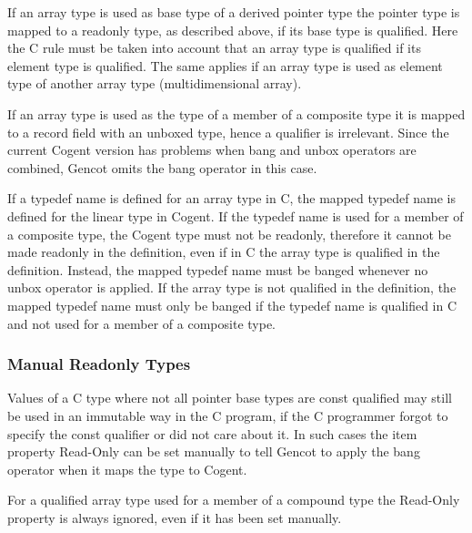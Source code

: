 If an array type is used as base type of a derived pointer type the pointer type is mapped to a readonly type, as
described above, if its base type is  qualified. Here the C rule must be taken into account that an array
type is  qualified if its element type is  qualified. The same applies if an array type is used
as element type of another array type (multidimensional array).

If an array type is used as the type of a member of a composite type it is mapped to a record field with an unboxed type,
hence a  qualifier is irrelevant. Since the current Cogent version has problems when bang and unbox operators
are combined, Gencot omits the bang operator in this case. 

If a typedef name is defined for an array type in C, the mapped typedef name is defined for the linear type in Cogent. 
If the typedef name is used for a member of a composite type, the Cogent type must not be readonly, therefore it
cannot be made readonly in the definition, even if in C the array type is  qualified in the definition.
Instead, the mapped typedef name must be banged whenever no unbox operator is applied. If the array type is not 
 qualified in the definition, the mapped typedef name must only be banged if the typedef name is 
qualified in C and not used for a member of a composite type.

\subsubsection{Manual Readonly Types}

Values of a C type where not all pointer base types are const qualified may still be used in an immutable way in the 
C program, if the C programmer forgot to specify the const qualifier or did not care about it. In such cases the item
property Read-Only can be set manually to tell Gencot to apply the bang operator when it maps the type to Cogent.

For a  qualified array type used for a member of a compound type the Read-Only property is always ignored,
even if it has been set manually.

